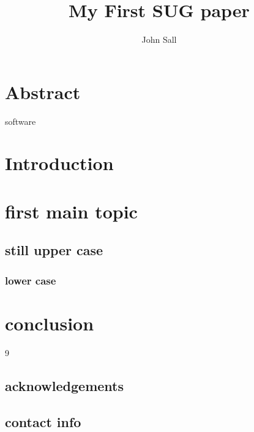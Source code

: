\documentclass{sugconf}
\title{My First SUG paper}
\author{John Sall}
\begin{document}
\maketitle
\section{Abstract}           %
\SASregistered software      %
 \tableofcontents\hrulefill  %
\section{Introduction}       %
\section{first main topic}   %
\subsection{still upper case}%
\subsubsection{lower case}   %
\section{conclusion}         %
\begin{thebibliography}{9}   %
\end{thebibliography}
\subsection{acknowledgements}%
\subsection{contact info}    %
\SASisRegisteredTrademark\par%
\OtherTrademarks             %
\end{document}

